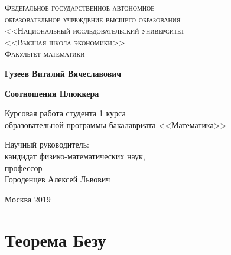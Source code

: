 \documentclass[a4paper, 12pt]{article}
\begin{document}
\begin{center}
{\scshape Федеральное государственное автономное\\
образовательное учреждение высшего образования\\
<<Национальный исследовательский университет\\
<<Высшая школа экономики>>\\[1ex]
Факультет математики\par}

\par\vfill

\textbf{\large Гузеев Виталий Вячеславович}

\vspace{1.5cm}

{\Large\bfseries
Соотношения Плюккера
\par}

\vspace{1.5cm}

Курсовая работа студента 1 курса\\[1ex]
образовательной программы бакалавриата <<Математика>>
\par\vfill
\noindent\hspace{0.52\textwidth}\parbox[t]{0.48\textwidth}{%
Научный руководитель:\\[3pt]
кандидат физико-математических наук,\\
профессор\\
Городенцев Алексей Львович\\[2ex]
}%
\par\vfill
Москва 2019
\end{center}
\thispagestyle{empty}
\pagebreak
\section{Теорема Безу}
\end{document}
